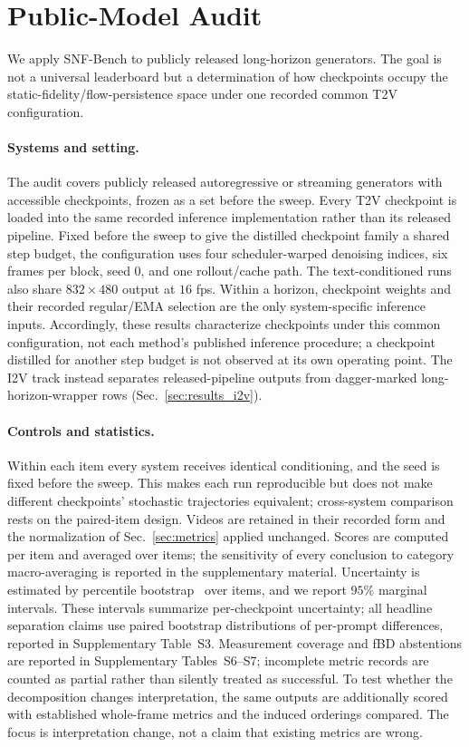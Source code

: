 \section{Public-Model Audit}
\label{sec:audit}

We apply SNF-Bench to publicly released long-horizon generators. The goal is not a universal leaderboard but a determination of how checkpoints occupy the static-fidelity/flow-persistence space under one recorded common T2V configuration.

\paragraph{Systems and setting.}
The audit covers \SNFnPublicTTV{} publicly released autoregressive or streaming generators with accessible checkpoints, frozen as a set before the sweep. Every T2V checkpoint is loaded into the same recorded inference implementation rather than its released pipeline. Fixed before the sweep to give the distilled checkpoint family a shared step budget, the configuration uses four scheduler-warped denoising indices, six frames per block, seed $0$, and one rollout/cache path. The text-conditioned runs also share $832\!\times\!480$ output at $16$ fps. Within a horizon, checkpoint weights and their recorded regular/EMA selection are the only system-specific inference inputs. Accordingly, these results characterize checkpoints under this common configuration, not each method's published inference procedure; a checkpoint distilled for another step budget is not observed at its own operating point. The I2V track instead separates released-pipeline outputs from dagger-marked long-horizon-wrapper rows (Sec.~\ref{sec:results_i2v}).

\paragraph{Controls and statistics.}
Within each item every system receives identical conditioning, and the seed is fixed before the sweep. This makes each run reproducible but does not make different checkpoints' stochastic trajectories equivalent; cross-system comparison rests on the paired-item design. Videos are retained in their recorded form and the normalization of Sec.~\ref{sec:metrics} applied unchanged. Scores are computed per item and averaged over items; the sensitivity of every conclusion to category macro-averaging is reported in the supplementary material. Uncertainty is estimated by percentile bootstrap~\cite{efron1979bootstrap} over items, and we report $95\%$ marginal intervals. These intervals summarize per-checkpoint uncertainty; all headline separation claims use paired bootstrap distributions of per-prompt differences, reported in Supplementary Table~S3. Measurement coverage and fBD abstentions are reported in Supplementary Tables~S6--S7; incomplete metric records are counted as partial rather than silently treated as successful. To test whether the decomposition changes interpretation, the same outputs are additionally scored with established whole-frame metrics and the induced orderings compared. The focus is interpretation change, not a claim that existing metrics are wrong.
